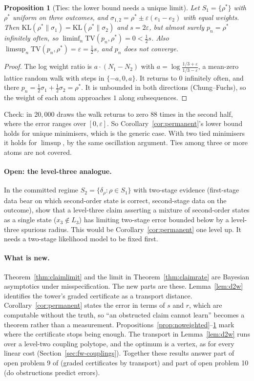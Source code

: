 \documentclass[11pt]{article}
\newtheorem{proposition}[theorem]{Proposition}
\theoremstyle{definition}
\theoremstyle{remark}
\begin{document}
\begin{proposition}[Ties: the lower bound needs a unique limit]\label{prop:ties}
Let $S_1=\{\rho^*\}$ with $\rho^*$ uniform on three outcomes, and $\sigma_{1,2}=\rho^*\pm\varepsilon(e_1-e_2)$ with equal weights. Then $\mathrm{KL}(\rho^*\|\sigma_1)=\mathrm{KL}(\rho^*\|\sigma_2)$ and $s=2\varepsilon$, but almost surely $p_n=\rho^*$ infinitely often, so $\liminf_n\mathrm{TV}(p_n,\rho^*)=0<\frac12 s$. Also $\limsup_n\mathrm{TV}(p_n,\rho^*)=\varepsilon=\frac12 s$, and $p_n$ does not converge.
\end{proposition}
\begin{proof}
The log weight ratio is $a\cdot(N_1-N_2)$ with $a=\log\frac{1/3+\varepsilon}{1/3-\varepsilon}$, a mean-zero lattice random walk with steps in $\{-a,0,a\}$. It returns to $0$ infinitely often, and there $p_n=\frac12\sigma_1+\frac12\sigma_2=\rho^*$. It is unbounded in both directions (Chung--Fuchs), so the weight of each atom approaches $1$ along subsequences.
\end{proof}
Check: in $20{,}000$ draws the walk returns to zero $88$ times in the second half, where the error ranges over $[0,\varepsilon]$. So Corollary~\ref{cor:permanent}'s lower bound holds for unique minimisers, which is the generic case. With two tied minimisers it holds for $\limsup$, by the same oscillation argument. Ties among three or more atoms are not covered.

\paragraph{Open: the level-three analogue.} In the committed regime $S_2=\{\delta_\rho:\rho\in S_1\}$ with two-stage evidence (first-stage data bear on which second-order state is correct, second-stage data on the outcome), show that a level-three claim asserting a mixture of second-order states as a single state ($x_3\notin L_3$) has limiting two-stage error bounded below by a level-three spurious radius. This would be Corollary~\ref{cor:permanent} one level up. It needs a two-stage likelihood model to be fixed first.

\paragraph{What is new.} Theorem~\ref{thm:claimlimit} and the limit in Theorem~\ref{thm:claimrate} are Bayesian asymptotics under misspecification. The new parts are these. Lemma~\ref{lem:d2w} identifies the tower's graded certificate as a transport distance. Corollary~\ref{cor:permanent} states the error in terms of $s$ and $r$, which are computable without the truth, so ``an obstructed claim cannot learn'' becomes a theorem rather than a measurement. Propositions~\ref{prop:noweighted}--\ref{prop:ties} mark where the certificate stops being enough. The transport in Lemma~\ref{lem:d2w} runs over a level-two coupling polytope, and the optimum is a vertex, as for every linear cost (Section~\ref{sec:fw-couplings}). Together these results answer part of open problem 9 of \cite{awasthiT} (graded certificates by transport) and part of open problem 10 (do obstructions predict errors).
\end{document}
